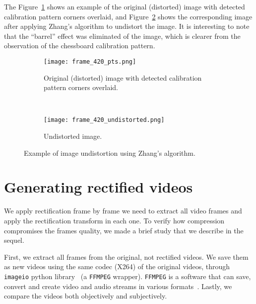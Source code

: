 The Figure~\ref{fig:undistort_1} shows an example of the original (distorted) image with detected calibration pattern corners overlaid,
and Figure~\ref{fig:undistort_2} shows the corresponding image after applying Zhang's algorithm to undistort the image.
It is interesting to note that the ``barrel'' effect was eliminated of the image, which
is clearer from the observation of the chessboard calibration pattern.
%
\begin{figure}[th!]
  \centering
  \begin{subfigure}[t]{.8\linewidth}
    \centering
    \texttt{[image: frame\_420\_pts.png]}
    \caption{Original (distorted) image with detected calibration pattern corners overlaid.}
    \label{fig:undistort_1}
  \end{subfigure}\\
  \begin{subfigure}[t]{0.8\linewidth}
    \centering
    \texttt{[image: frame\_420\_undistorted.png]}
    \caption{Undistorted image.}
    \label{fig:undistort_2}
  \end{subfigure}
  \caption{Example of image undistortion using Zhang's algorithm.}
  \label{fig:undistort}
\end{figure}




  \section{Generating rectified videos}
  We apply rectification frame by frame \ie
  we need to extract all video frames and apply the rectification transform in each one.
  To verify how compression compromises the frames quality, we made a brief study that we describe in the sequel.

  First, we extract all frames from the original, not rectified videos.
  We save them as new videos using the same codec (X264) of the original videos, through
  \verb|imageio| python library~\cite{imageio} (a \verb|FFMPEG| wrapper).
  \verb|FFMPEG| is a software that can save, convert and create video and audio streams in various formats~\cite{web:ffmpeg}.
  Lastly, we compare the videos both objectively and subjectively.


